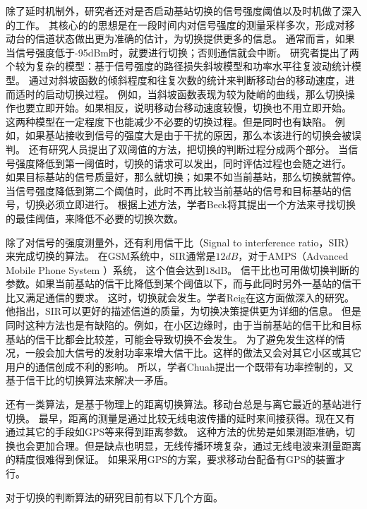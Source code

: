 除了延时机制外，研究者还对是否启动基站切换的信号强度阈值以及时机做了深入的工作。
其核心的的思想是在一段时间内对信号强度的测量采样多次，形成对移动台的信道状态做出更为准确的估计，为切换提供更多的信息。
通常而言，如果当信号强度低于-95dBm时，就要进行切换；否则通信就会中断。
研究者提出了两个较为复杂的模型：基于信号强度的路径损失斜坡模型和功率水平往复波动统计模型\cite{William1995}。
通过对斜坡函数的倾斜程度和往复次数的统计来判断移动台的移动速度，进而适时的启动切换过程。
例如，当斜坡函数表现为较为陡峭的曲线，那么切换操作也要立即开始。如果相反，说明移动台移动速度较慢，切换也不用立即开始。
这两种模型在一定程度下也能减少不必要的切换过程。但是同时也有缺陷。
例如，如果基站接收到信号的强度大是由于干扰的原因，那么本该进行的切换会被误判。
还有研究人员提出了双阈值的方法，把切换的判断过程分成两个部分。
当信号强度降低到第一阈值时，切换的请求可以发出，同时评估过程也会随之进行。
如果目标基站的信号质量好，那么就切换；如果不如当前基站，那么切换就暂停。
当信号强度降低到第二个阈值时，此时不再比较当前基站的信号和目标基站的信号，切换必须立即进行。
根据上述方法，学者Beck将其提出一个方法来寻找切换的最佳阈值，来降低不必要的切换次数\cite{40070}。

\par 除了对信号的强度测量外，还有利用信干比（Signal to interference ratio，SIR）来完成切换的算法。
在GSM系统中，SIR通常是$12dB$，对于AMPS（Advanced Mobile Phone System ）系统， 这个值会达到$18$dB。
信干比也可用做切换判断的参数。如果当前基站的信干比降低到某个阈值以下，而与此同时另外一基站的信干比又满足通信的要求。
这时，切换就会发生。学者Reig在这方面做深入的研究\cite{1658431}\cite{1390624}\cite{1370826}。
他指出，SIR可以更好的描述信道的质量，为切换决策提供更为详细的信息。
但是同时这种方法也是有缺陷的。例如，在小区边缘时，由于当前基站的信干比和目标基站的信干比都会比较差，可能会导致切换不会发生。
为了避免发生这样的情况，一般会加大信号的发射功率来增大信干比。这样的做法又会对其它小区或其它用户的通信创成不利的影响。
所以，学者Chuah提出一个既带有功率控制的，又基于信干比的切换算法来解决一矛盾\cite{504935}。


\par 还有一类算法，是基于物理上的距离切换算法。移动台总是与离它最近的基站进行切换。
最早，距离的测量是通过比较无线电波传播的延时来间接获得\cite{Rolle1986}。现在又有通过其它的手段如GPS等来得到距离参数\cite{5349100}\cite{4534769}。
这种方法的优势是如果测距准确，切换也会更加合理。但是缺点也明显，无线传播环境复杂，通过无线电波来测量距离的精度很难得到保证。
如果采用GPS的方案，要求移动台配备有GPS的装置才行。

对于切换的判断算法的研究目前有以下几个方面。

